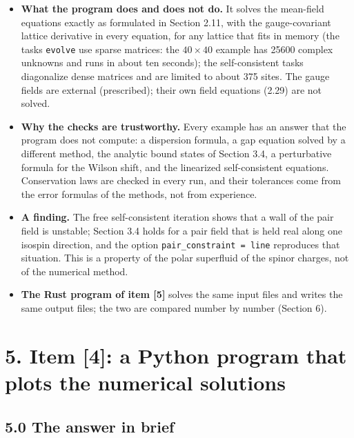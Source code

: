 \documentclass[
  10pt,
]{article}
\providecommand{\tightlist}{%
  \setlength{\itemsep}{0pt}\setlength{\parskip}{0pt}}
\begin{document}
\begin{itemize}
\tightlist
\item
  \textbf{What the program does and does not do.} It solves the
  mean-field equations exactly as formulated in Section 2.11, with the
  gauge-covariant lattice derivative in every equation, for any lattice
  that fits in memory (the tasks \texttt{evolve} use sparse matrices:
  the \(40\times40\) example has 25600 complex unknowns and runs in
  about ten seconds); the self-consistent tasks diagonalize dense
  matrices and are limited to about 375 sites. The gauge fields are
  external (prescribed); their own field equations (2.29) are not
  solved.
\item
  \textbf{Why the checks are trustworthy.} Every example has an answer
  that the program does not compute: a dispersion formula, a gap
  equation solved by a different method, the analytic bound states of
  Section 3.4, a perturbative formula for the Wilson shift, and the
  linearized self-consistent equations. Conservation laws are checked in
  every run, and their tolerances come from the error formulas of the
  methods, not from experience.
\item
  \textbf{A finding.} The free self-consistent iteration shows that a
  wall of the pair field is unstable; Section 3.4 holds for a pair field
  that is held real along one isospin direction, and the option
  \texttt{pair\_constraint\ =\ line} reproduces that situation. This is
  a property of the polar superfluid of the spinor charges, not of the
  numerical method.
\item
  \textbf{The Rust program of item {[}5{]}} solves the same input files
  and writes the same output files; the two are compared number by
  number (Section 6).
\end{itemize}

\hypertarget{item-4-a-python-program-that-plots-the-numerical-solutions}{%
\section{5. Item {[}4{]}: a Python program that plots the numerical
solutions}\label{item-4-a-python-program-that-plots-the-numerical-solutions}}

\hypertarget{the-answer-in-brief-3}{%
\subsection{5.0 The answer in brief}\label{the-answer-in-brief-3}}
\end{document}

